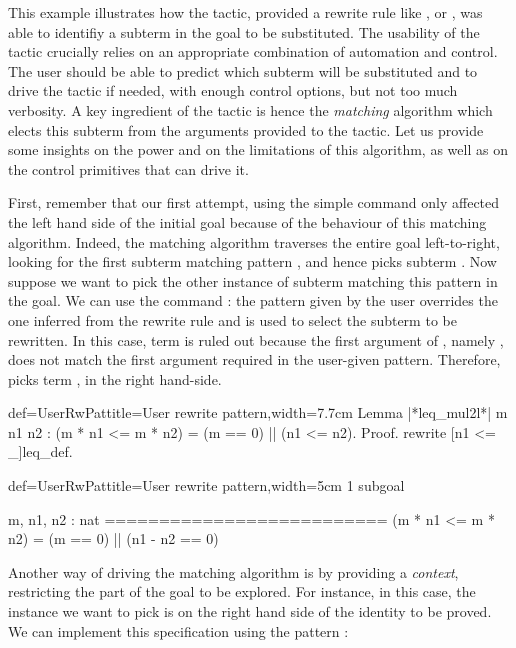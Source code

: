 This example illustrates how the  tactic, provided a
rewrite rule like ,  or , was able
to identifiy a
subterm in the goal to be substituted. The usability of the
tactic crucially relies on an appropriate combination of automation
and control. The user should be able to predict which subterm will be
substituted and to drive the tactic if needed, with enough control
options, but not too much verbosity. A key ingredient of the
 tactic is hence the \emph{matching} algorithm which
elects this subterm from the arguments provided to the tactic. Let us
provide some insights on the power and on the limitations of this
algorithm, as well as on the control primitives that can drive it.

First, remember that our first attempt, using the simple
 command only
affected the left hand side of the initial goal because of the
behaviour of this matching algorithm.
Indeed, the matching algorithm traverses the entire goal
left-to-right, looking for the first subterm matching pattern
\C{(_ <= _)},  and hence picks subterm .
Now suppose we want to pick
the other instance of subterm matching this pattern in the goal. We
can use the command : the
pattern given by the user overrides the one inferred from the rewrite
rule and is used to select the subterm to be rewritten. In this case,
term  is ruled out because the first argument of
\C{<=}, namely , does not match the first argument 
required in the user-given pattern. Therefore,  picks term
, in the right hand-side.

\begin{coq}{def=UserRwPat}{title=User rewrite pattern,width=7.7cm}
Lemma |*leq_mul2l*| m n1 n2 :
(m * n1 <= m * n2) = (m == 0) || (n1 <= n2).
Proof.
rewrite [n1 <= _]leq_def.
\end{coq}
\begin{coqout}{def=UserRwPat}{title=User rewrite pattern,width=5cm}
1 subgoal

m, n1, n2 : nat
==========================
(m * n1 <= m * n2) =
(m == 0) || (n1 - n2 == 0)
\end{coqout}

Another way of driving the matching algorithm is by providing a
\emph{context}, restricting the part of the goal to be explored. For
instance, in this case, the instance we want to pick is on
the right hand side of the identity to be proved. We can implement
this specification using the pattern \C{[in RHS]}:

